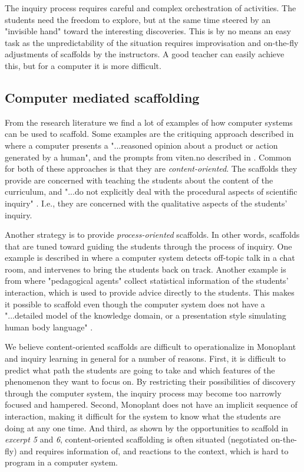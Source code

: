 The inquiry process requires careful and complex orchestration of activities. The students need the freedom to explore, but at the same time steered by an "invisible hand" toward the interesting discoveries. This is by no means an easy task as the unpredictability of the situation requires improvisation and on-the-fly adjustments of scaffolds by the instructors. A good teacher can easily achieve this, but for a computer it is more difficult. 

\subsection{Computer mediated scaffolding}
From the research literature we find a lot of examples of how computer systems can be used to scaffold. Some examples are the critiquing approach described in \citet{fischer1991critics} where a computer presents a "...reasoned opinion about a product or action generated by a human", and the prompts from viten.no described in \citep{furberg2009socio}. Common for both of these approaches is that they are \emph{content-oriented}. The scaffolds they provide are concerned with teaching the students about the content of the curriculum, and "...do not explicitly deal with the procedural aspects of scientific inquiry" \citep{furberg2009socio}. I.e., they are concerned with the qualitative aspects of the students' inquiry. 

Another strategy is to provide \emph{process-oriented} scaffolds. In other words, scaffolds that are tuned toward guiding the students through the process of inquiry. One example is described in \citet{soller2005mirroring} where a computer system detects off-topic talk in a chat room, and intervenes to bring the students back on track. Another example is from \citet{morch2003integrating} where "pedagogical agents" collect statistical information of the students' interaction, which is used to provide advice directly to the students. This makes it possible to scaffold even though the computer system does not have a "...detailed model of the knowledge domain, or a presentation style simulating human body language" \citep{morch2003integrating}. 

We believe content-oriented scaffolds are difficult to operationalize in Monoplant and inquiry learning in general for a number of reasons. First, it is difficult to predict what path the students are going to take and which features of the phenomenon they want to focus on. By restricting their possibilities of discovery through the computer system, the inquiry process may become too narrowly focused and hampered. Second, Monoplant does not have an implicit sequence of interaction, making it difficult for the system to know what the students are doing at any one time. And third, as shown by the opportunities to scaffold in \emph{excerpt 5} and \emph{6}, content-oriented scaffolding is often situated (negotiated on-the-fly) and requires information of, and reactions to the context, which is hard to program in a computer system. 

